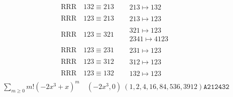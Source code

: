 \documentclass{article}
\begin{document}
\begin{align}
\text{RRR}
\quad
132\equiv213
\quad
&
\begin{matrix}
213 \mapsto 132
\end{matrix}
\\
\text{RRR}
\quad
123\equiv213
\quad
&
\begin{matrix}
213 \mapsto 123
\end{matrix}
\\
\text{RRR}
\quad
123\equiv321
\quad
&
\begin{matrix}
321 \mapsto 123
\\
2341 \mapsto 4123
\end{matrix}
\\
\text{RRR}
\quad
123\equiv231
\quad
&
\begin{matrix}
231 \mapsto 123
\end{matrix}
\\
\text{RRR}
\quad
123\equiv312
\quad
&
\begin{matrix}
312 \mapsto 123
\end{matrix}
\\
\text{RRR}
\quad
123\equiv132
\quad
&
\begin{matrix}
132 \mapsto 123
\end{matrix}
\end{align}
$$
\begin{matrix}
\sum_{m \geq 0} m! \left(
-2 x^{3} + x
\right)^m
\quad
\left(-2 x^{3}, 0\right)
\ 
\left(1, 2, 4, 16, 84, 536, 3912\right)
\texttt{
A212432
}
\end{matrix}
$$
\end{document}

